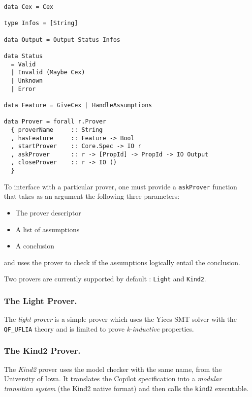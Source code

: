 \begin{lstlisting}[frame=single]
data Cex = Cex

type Infos = [String]

data Output = Output Status Infos

data Status
  = Valid
  | Invalid (Maybe Cex)
  | Unknown
  | Error
  
data Feature = GiveCex | HandleAssumptions
  
data Prover = forall r.Prover 
  { proverName     :: String
  , hasFeature     :: Feature -> Bool
  , startProver    :: Core.Spec -> IO r
  , askProver      :: r -> [PropId] -> PropId -> IO Output 
  , closeProver    :: r -> IO () 
  }

\end{lstlisting}

To interface with a  particular prover, one must  provide a \texttt{askProver} function that
takes as an argument  the following three parameters: 
\begin{itemize} 
\item  The prover descriptor 
\item  A list of assumptions 
\item  A conclusion
\end{itemize} 
and uses the prover to check if the assumptions logically entail the conclusion.

Two provers are currently supported by default : \texttt{Light} and \texttt{Kind2}.

\subsubsection{The Light Prover.}\label{the-light-prover}

The \emph{light prover} is a simple prover which uses the Yices
SMT solver with the \texttt{QF\_UFLIA} theory and is limited to prove
\emph{k-inductive} properties.

\subsubsection{The Kind2 Prover.}\label{the-kind2-prover}

The \emph{Kind2} prover uses the model checker with the same name, from
the University of Iowa. It translates the Copilot specification into a
\emph{modular transition system} (the Kind2 native format) and then
calls the \texttt{kind2} executable.

%

